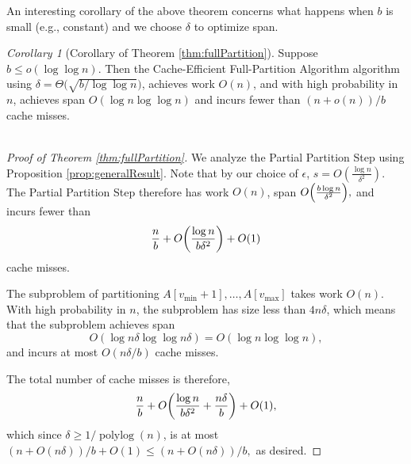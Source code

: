 \documentclass[11pt]{article}
\DeclarePairedDelimiter{\paren}{(}{)}
\newcommand{\polylog}{\operatorname{polylog}}
\theoremstyle{remark}
\newtheorem{corollary}[thm]{Corollary}
\theoremstyle{remark}
\begin{document}

An interesting corollary of the above theorem concerns what happens when $b$ is small (e.g., constant) and we choose $\delta$ to optimize span. 

\begin{corollary}[Corollary of Theorem \ref{thm:fullPartition}]
	\label{cor:fullPartition}
Suppose $b \le o(\log \log n)$. Then the Cache-Efficient Full-Partition Algorithm algorithm using $\delta = \Theta\big(\sqrt{b/\log\log n}\big)$, achieves work $O(n)$, and with high probability in $n$, achieves span $O(\log n \log\log n)$ and incurs fewer than $(n+o(n))/b$ cache misses.\\\\
\end{corollary}

\begin{proof}[Proof of Theorem \ref{thm:fullPartition}]
  
  We analyze the Partial Partition Step using Proposition
  \ref{prop:generalResult}. Note that by our choice of $\epsilon$,
  $s=O\left(\frac{\log n}{\delta^2}\right)$.  The Partial Partition
  Step therefore has work $O(n)$, span $O\paren*{\frac{b\log
      n}{\delta^2}},$ and incurs fewer than
	$$\frac{n}{b}+O\paren*{\frac{\log n}{b\delta^2}}+O(1)$$ 
  cache misses.

  The subproblem of partitioning $A[v_{\text{min}} + 1], \ldots,
   A[v_{\text{max}}]$ takes work $O(n)$. With high probability in $n$,
  the subproblem has size less than $4n\delta$, which means that the subproblem
  achieves span
  $$O(\log n\delta \log\log n\delta) = O(\log n \log\log n),$$
  and incurs at most $O(n \delta / b)$ cache misses.

  The total number of cache misses is therefore,
  	$$\frac{n}{b}+O\paren*{\frac{\log n}{b\delta^2} +
    \frac{n\delta}{b}}+O(1),$$ which since $\delta \ge 1 /
  \polylog(n)$, is at most $(n+O(n\delta))/b + O(1) \le (n + O(n
  \delta)) / b,$ as desired.
\end{proof}
\end{document}
